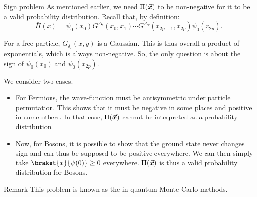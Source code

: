 \documentclass[a4paper]{article}
\begin{document}
\begin{parag}{Sign problem}
    As mentioned earlier, we need $\Pi\left(\bvec{x}\right)$ to be non-negative for it to be a valid probability distribution.  Recall that, by definition:
    \[\bar{\Pi}\left(x\right) = \psi_0\left(x_0\right) G^{\Delta_{\tau}}\left(x_0, x_1\right) \cdots G^{\Delta_{\tau}}\left(x_{2p-1}, x_{2p}\right) \psi_0\left(x_{2p}\right).\]

    For a free particle, $G_{\delta_{\tau}}\left(x, y\right)$ is a Gaussian. This is thus overall a product of exponentials, which is always non-negative. So, the only question is about the sign of $\psi_0\left(x_0\right)$ and $\psi_0\left(x_{2p}\right)$. 

    We consider two cases.
    \begin{itemize}[left=0pt]
        \item For Fermions, the wave-function must be antisymmetric under particle permutation. This shows that it must be negative in some places and positive in some others. In that case, $\Pi\left(\bvec{x}\right)$ cannot be interpreted as a probability distribution.
        \item Now, for Bosons, it is possible to show that the ground state never changes sign and can thus be supposed to be positive everywhere. We can then simply take $\braket{x}{\psi\left(0\right)} \geq 0$ everywhere. $\Pi\left(\bvec{x}\right)$ is thus a valid probability distribution for Bosons.
    \end{itemize}
     
    \begin{subparag}{Remark}
        This problem is known as the  in quantum Monte-Carlo methods.
    \end{subparag}
\end{parag}
\end{document}
